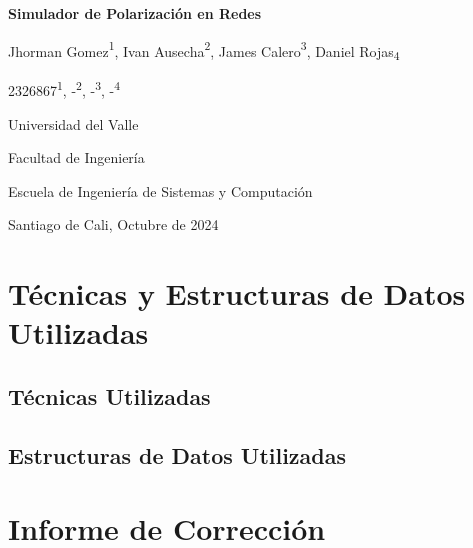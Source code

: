 \documentclass{article}
\begin{document}
  \begin{titlepage}
    \centering
    \vspace*{2cm}
    
    \Huge
    \textbf{Simulador de Polarización en Redes}
    
    \vspace{1.5cm}
    
    \Large
    Jhorman Gomez{\textsuperscript{1}}, Ivan Ausecha{\textsuperscript{2}}, James Calero{\textsuperscript{3}}, Daniel Rojas{\textsubscript{4}}
    
    \vspace{0.5cm}
    
    \large
    2326867{\textsuperscript{1}}, -{\textsuperscript{2}}, -{\textsuperscript{3}}, -{\textsuperscript{4}}
    
    \vspace{0.5cm}
    
    \Large
    Universidad del Valle
    
    \vspace{0.5cm}
    
    \large
    Facultad de Ingeniería
    
    \vspace{0.5cm}
    
    \large
    Escuela de Ingeniería de Sistemas y Computación
    
    \vspace{0.5cm}
    
    \large
    Santiago de Cali, Octubre de 2024
    
  \end{titlepage}

  \section{Técnicas y Estructuras de Datos Utilizadas}

    \subsection{Técnicas Utilizadas}

    \subsection{Estructuras de Datos Utilizadas}

  \section{Informe de Corrección}
\end{document}
